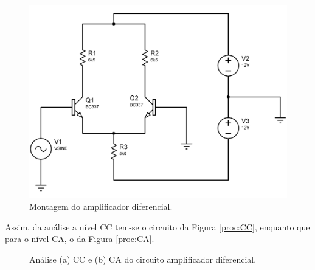 \documentclass[a4paper,12pt,oneside,openany,table,xcdraw]{article}
\begin{document}
\vspace{0.5cm}
\begin{figure}[H]
\centering
\includegraphics[width=13cm]{montagem}
\caption{Montagem do amplificador diferencial.}
\label{proc:montagem}
\end{figure}
\vspace{0.5cm}

Assim, da análise a nível CC tem-se o circuito da Figura \ref{proc:CC}, enquanto que para o nível CA, o da Figura \ref{proc:CA}.

 \vspace{0.5cm}
\begin{figure}[H]
\center
{}
\qquad
{}
\caption{Análise (a) CC e (b) CA do circuito amplificador diferencial.}
\label{proc:analise}
\end{figure}
\vspace{0.5cm}
\end{document}
